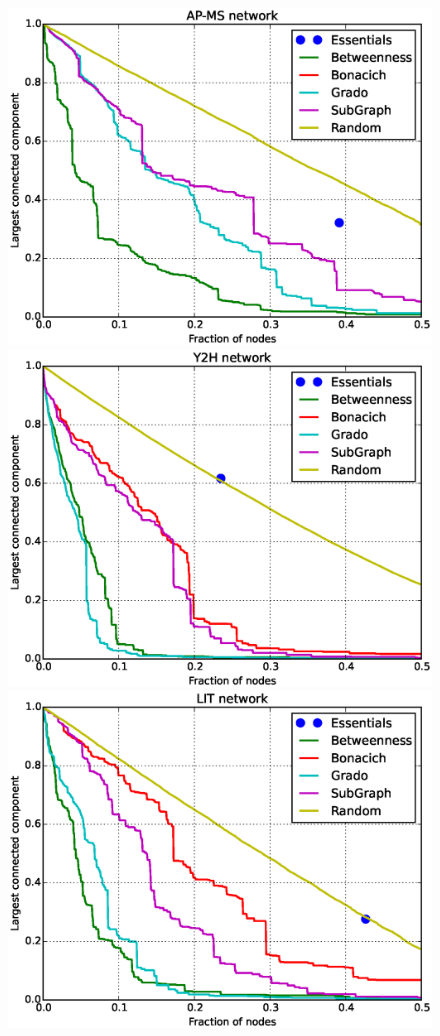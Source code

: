 \begin{figure}
\centering
\includegraphics[scale = 0.3]{figuras/AP-MS_b} 
\includegraphics[scale = 0.3]{figuras/Y2H_b} \\
\includegraphics[scale = 0.3]{figuras/LIT_b} 

\end{figure}
